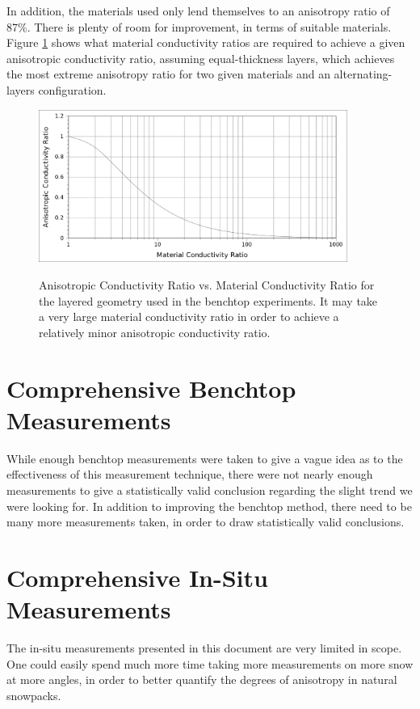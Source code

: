 In addition, the materials used only lend themselves to an anisotropy ratio of
87\%. There is plenty of room for improvement, in terms of suitable materials.
Figure \ref{fig:anisovmatl_rats} shows what material conductivity ratios are
required to achieve a given anisotropic conductivity ratio, assuming
equal-thickness layers, which achieves the most extreme anisotropy ratio for two given materials and an alternating-layers configuration. 

\begin{figure}[h]
\centering
\includegraphics[width=0.9\textwidth]{fig/anisovmaterial_ratios.png}
\label{fig:anisovmatl_rats}
\caption{Anisotropic Conductivity Ratio vs. Material Conductivity Ratio for the
layered geometry used in the benchtop experiments. It may take a very large
material conductivity ratio in order to achieve a relatively minor anisotropic
conductivity ratio.}
\end{figure}

\section{Comprehensive Benchtop Measurements}

While enough benchtop measurements were taken to give a vague idea as to the
effectiveness of this measurement technique, there were not nearly enough
measurements to give a statistically valid conclusion regarding the slight
trend we were looking for. In addition to improving the benchtop method, there
need to be many more measurements taken, in order to draw statistically valid
conclusions.

\section{Comprehensive In-Situ Measurements}

The in-situ measurements presented in this document are very limited in scope.
One could easily spend much more time taking more measurements on more snow at
more angles, in order to better quantify the degrees of anisotropy in natural
snowpacks.

